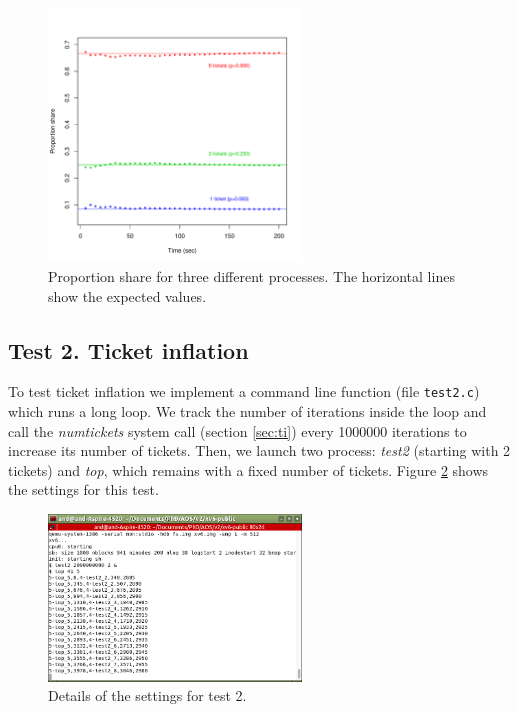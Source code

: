 \documentclass[10pt]{scrartcl}
\begin{document}
\begin{figure}
  \centering
  \includegraphics[width=0.6\textwidth]{test1b}
  \caption{Proportion share for three different processes. The horizontal lines show the expected values.}\label{fig:test1b}
\end{figure}

\subsection{Test 2. Ticket inflation}
To test ticket inflation we implement a command line function (file \texttt{test2.c}) which runs a long loop.  We track the number of iterations inside the loop and call the \textit{numtickets} system call (section \ref{sec:ti}) every 1000000 iterations to increase its number of tickets. Then, we launch two process: \textit{test2} (starting with 2 tickets) and \textit{top}, which remains with a fixed number of tickets.  Figure \ref{fig:test2a} shows the settings for this test.  

\begin{figure}
  \centering
  \includegraphics[width=0.6\textwidth]{test2c.png}
  \caption{Details of the settings for test 2.}\label{fig:test2a}
\end{figure}
\end{document}
